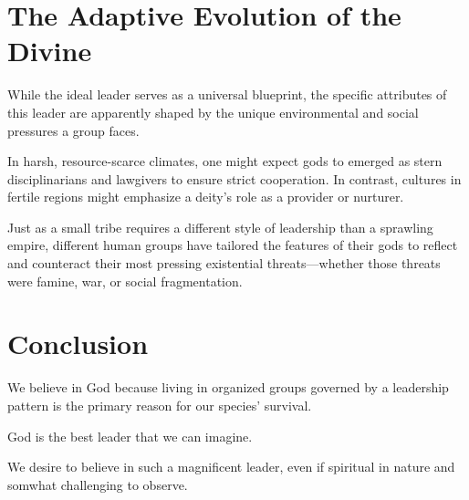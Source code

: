 \section{The Adaptive Evolution of the Divine}

While the ideal leader serves as a universal blueprint, the specific attributes of this leader are apparently shaped by the unique environmental and social pressures a group faces.

In harsh, resource-scarce climates, one might expect gods to emerged as stern disciplinarians and lawgivers to ensure strict cooperation.
In contrast, cultures in fertile regions might emphasize a deity’s role as a provider or nurturer.

Just as a small tribe requires a different style of leadership than a sprawling empire, different human groups have tailored the features of 
their gods to reflect and counteract their most pressing existential threats—whether those threats were famine, war, or social fragmentation. 


\section{Conclusion}

We believe in God because living in organized groups governed by a leadership pattern is the primary reason for our species' survival.

God is the best leader that we can imagine.

We desire to believe in such a magnificent leader, even if spiritual in nature and somwhat challenging to observe.
